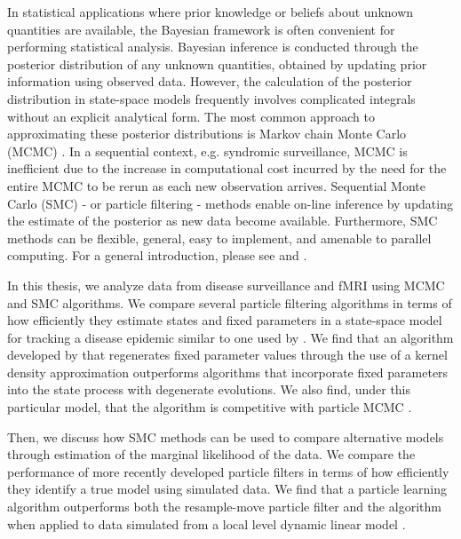 In statistical applications where prior knowledge or beliefs about unknown quantities are available, the Bayesian framework is often convenient for performing statistical analysis.  Bayesian inference is conducted through the posterior distribution of any unknown quantities, obtained by updating prior information using observed data. However, the calculation of the posterior distribution in state-space models frequently involves complicated integrals without an explicit analytical form. The most common approach to approximating these posterior distributions is Markov chain Monte Carlo (MCMC) \citep{Gelf:Smit:samp:1990}. In a sequential context, e.g. syndromic surveillance, MCMC is inefficient due to the increase in computational cost incurred by the need for the entire MCMC to be rerun as each new observation arrives. Sequential Monte Carlo (SMC) - or particle filtering - methods enable on-line inference by updating the estimate of the posterior as new data become available. Furthermore, SMC methods can be flexible, general, easy to implement, and amenable to parallel computing. For a general introduction, please see \cite{Douc:deFr:Gord:sequ:2001} and \cite{cappe2007overview}.

In this thesis, we analyze data from disease surveillance and fMRI using MCMC and SMC algorithms. We compare several particle filtering algorithms in terms of how efficiently they estimate states and fixed parameters in a state-space model for tracking a disease epidemic similar to one used by \citet{skvortsov2012monitoring}. We find that an algorithm developed by \citet{Liu:West:comb:2001} that regenerates fixed parameter values through the use of a kernel density approximation outperforms algorithms that incorporate fixed parameters into the state process with degenerate evolutions. We also find, under this particular model, that the \citet{Liu:West:comb:2001} algorithm is competitive with particle MCMC \citep{Andr:Douc:Hol:pmcmc:2010}.

Then, we discuss how SMC methods can be used to compare alternative models through estimation of the marginal likelihood of the data. We compare the performance of more recently developed particle filters in terms of how efficiently they identify a true model using simulated data. We find that a particle learning algorithm \citep{Carv:Joha:Lope:Pols:part} outperforms both the resample-move particle filter \citep{Gilk:Berz:foll:2001} and the \citet{Liu:West:comb:2001} algorithm when applied to data simulated from a local level dynamic linear model \cite[see Chapter 4.3.1][]{petris:camp:2009:dynamic}.

